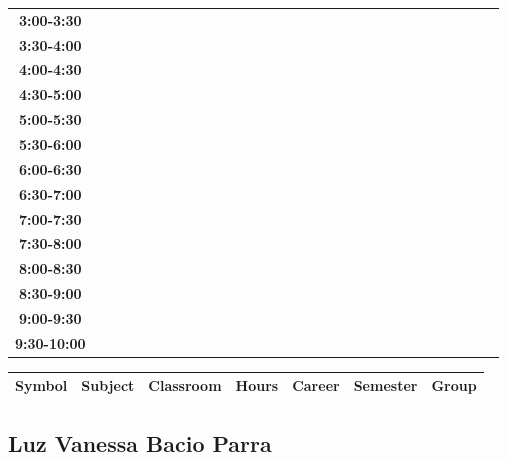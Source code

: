 \documentclass{article}
\begin{document}
\begin{table}[ht]
\begin{tabular}{|c|c|c|c|c|c|c|c|c|c|c|c|c|c|c|c|c|c|c|c|c|c|c|c|c|c|c|c|c|c|}
\textbf{3:00-3:30} &   &   &   &   &   &   &   \\
 \cline{1-8} 
\textbf{3:30-4:00} &   &   &   &   &   &   &   \\
 \cline{1-8} 
\textbf{4:00-4:30} &   &   &   &   &   &   &   \\
 \cline{1-8} 
\textbf{4:30-5:00} &   &   &   &   &   &   &   \\
 \cline{1-8} 
\textbf{5:00-5:30} &   &   &   &   &   &   &   \\
 \cline{1-8} 
\textbf{5:30-6:00} &   &   &   &   &   &   &   \\
 \cline{1-8} 
\textbf{6:00-6:30} &   &   &   &   &   &   &   \\
 \cline{1-8} 
\textbf{6:30-7:00} &   &   &   &   &   &   &   \\
 \cline{1-8} 
\textbf{7:00-7:30} &   &   &   &   &   &   &   \\
 \cline{1-8} 
\textbf{7:30-8:00} &   &   &   &   &   &   &   \\
 \cline{1-8} 
\textbf{8:00-8:30} &   &   &   &   &   &   &   \\
 \cline{1-8} 
\textbf{8:30-9:00} &   &   &   &   &   &   &   \\
 \cline{1-8} 
\textbf{9:00-9:30} &   &   &   &   &   &   &   \\
 \cline{1-8} 
\textbf{9:30-10:00} &   &   &   &   &   &   &   \\
 \cline{1-8} 
\end{tabular}\end{table}

        
        \begin{tabular}{|>{\centering\arraybackslash}m{2cm}|>{\centering\arraybackslash}m{4cm}|>{\centering\arraybackslash}m{2cm}|>{\centering\arraybackslash}m{2cm}|>{\centering\arraybackslash}m{2cm}|>{\centering\arraybackslash}m{2cm}|>{\centering\arraybackslash}m{2cm}|}
        \hline
        \textbf{Symbol} & \textbf{Subject} & \textbf{Classroom} & \textbf{Hours} & \textbf{Career} & \textbf{Semester} & \textbf{Group} \\
        \hline
        \end{tabular}
                    

        \newpage
        

        \subsection{Luz Vanessa Bacio Parra}
        \vspace*{.1cm}
        
\end{document}
